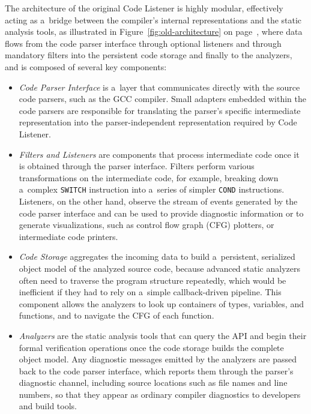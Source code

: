 \documentclass[xpsejal00-gcc-plugin.tex]{subfiles}
\begin{document}
The architecture of the original Code Listener is highly modular, effectively acting as a~bridge between the compiler's internal representations and the static analysis tools, as illustrated in Figure~\ref{fig:old-architecture} on page~\pageref{fig:old-architecture}, where data flows from the code parser interface through optional listeners and through mandatory filters into the persistent code storage and finally to the analyzers, and is composed of several key components:
\begin{itemize}
  \item \textit{Code Parser Interface} is a~layer that communicates directly with the source code parsers, such as the GCC compiler.
    Small adapters embedded within the code parsers are responsible for translating the parser's specific intermediate representation into the parser-independent representation required by Code Listener.

  \item \textit{Filters and Listeners} are components that process intermediate code once it is obtained through the parser interface.
    Filters perform various transformations on the intermediate code, for example, breaking down a~complex \texttt{SWITCH} instruction into a~series of simpler \texttt{COND} instructions.
    Listeners, on the other hand, observe the stream of events generated by the code parser interface and can be used to provide diagnostic information or to generate visualizations, such as control flow graph (CFG) plotters, or intermediate code printers.

  \item \textit{Code Storage} aggregates the incoming data to build a~persistent, serialized object model of the analyzed source code, because advanced static analyzers often need to traverse the program structure repeatedly, which would be inefficient if they had to rely on a~simple callback-driven pipeline.
    This component allows the analyzers to look up containers of types, variables, and functions, and to navigate the CFG of each function.

  \item \textit{Analyzers} are the static analysis tools that can query the API and begin their formal verification operations once the code storage builds the complete object model.
    Any diagnostic messages emitted by the analyzers are passed back to the code parser interface, which reports them through the parser's diagnostic channel, including source locations such as file names and line numbers, so that they appear as ordinary compiler diagnostics to developers and build tools.

\end{itemize}
\end{document}
